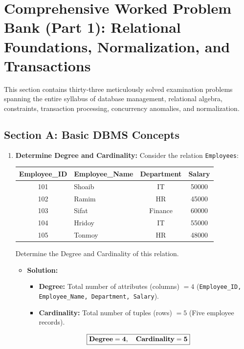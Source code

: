 \newpage
\section{Comprehensive Worked Problem Bank (Part 1): Relational Foundations, Normalization, and Transactions}

This section contains thirty-three meticulously solved examination problems spanning the entire syllabus of database management, relational algebra, constraints, transaction processing, concurrency anomalies, and normalization.

\subsection{Section A: Basic DBMS Concepts}

\begin{enumerate}[label=\textbf{Problem \arabic*.},leftmargin=1.5cm]
\item \textbf{Determine Degree and Cardinality:}
Consider the relation \texttt{Employees}:
\begin{table}[htbp]
\centering
\begin{tabularx}{0.8\textwidth}{c X c c}
\toprule
\textbf{Employee\_ID} & \textbf{Employee\_Name} & \textbf{Department} & \textbf{Salary} \\
\midrule
101 & Shoaib & IT & 50000 \\
102 & Ramim & HR & 45000 \\
103 & Sifat & Finance & 60000 \\
104 & Hridoy & IT & 55000 \\
105 & Tonmoy & HR & 48000 \\
\bottomrule
\end{tabularx}
\end{table}
Determine the Degree and Cardinality of this relation.
\begin{itemize}
\item \textbf{Solution:}
\begin{itemize}
\item \textbf{Degree:} Total number of attributes (columns) $= 4$ (\texttt{Employee\_ID, Employee\_Name, Department, Salary}).
\item \textbf{Cardinality:} Total number of tuples (rows) $= 5$ (Five employee records).
\end{itemize}
\[ \boxed{\text{\textbf{Degree}} = \mathbf{4}, \quad \text{\textbf{Cardinality}} = \mathbf{5}} \]
\end{itemize}


\end{enumerate}
